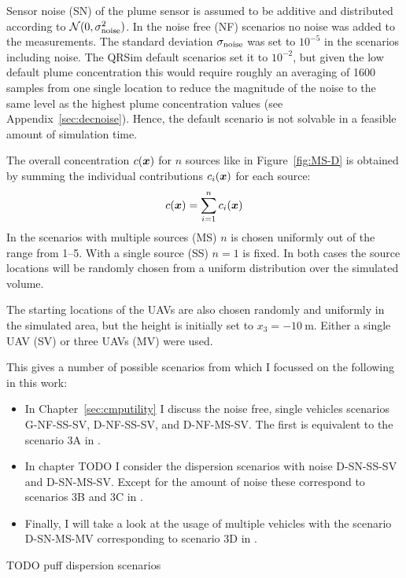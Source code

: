 Sensor noise (SN) of the plume sensor is assumed to be additive and distributed 
according to $\mathcal{N}(0, \sigma_{\mathrm{noise}}^2)$. In the noise free (NF) 
scenarios no noise was added to the measurements. The standard deviation 
$\sigma_{\mathrm{noise}}$ was set to $10^{-5}$ in the scenarios including noise. The 
QRSim default scenarios set it to $10^{-2}$, but given the low default plume 
concentration this would require roughly an averaging of 1600 samples from one 
single location to reduce the magnitude of the noise to the same level as the 
highest plume concentration values (see Appendix~\ref{sec:decnoise}). Hence, the 
default scenario is not solvable in a feasible amount of simulation time.

The overall concentration $c(\bm{x})$ for $n$ sources like in 
Figure~\ref{fig:MS-D} is obtained by summing the individual contributions 
$c_i(\bm{x})$ for each source:
\begin{equation}
    c(\bm{x}) = \sum_{i = 1}^n c_i(\bm{x})
\end{equation}
In the scenarios with multiple sources (MS) $n$ is chosen uniformly out of the 
range from \numrange{1}{5}. With a single source (SS) $n = 1$ is fixed. In both 
cases the source locations will be randomly chosen from a uniform distribution 
over the simulated volume.

The starting locations of the UAVs are also chosen randomly and uniformly in the 
simulated area, but the height is initially set to $x_3 = \SI{-10}{\meter}$.  
Either a single UAV (SV) or three UAVs (MV) were used.

This gives a number of possible scenarios from which I focussed on the following 
in this work:
\begin{itemize}
    \item In Chapter~\ref{sec:cmputility} I discuss the noise free, single 
        vehicles scenarios G-NF-SS-SV, D-NF-SS-SV, and D-NF-MS-SV\@. The first 
        is equivalent to the scenario 3A in \textcite{denardi2013rn}.
    \item In chapter TODO I consider the dispersion scenarios with noise 
        D-SN-SS-SV and D-SN-MS-SV\@. Except for the amount of noise these 
        correspond to scenarios 3B and 3C in \textcite{denardi2013rn}.
    \item Finally, I will take a look at the usage of multiple vehicles with the 
        scenario D-SN-MS-MV corresponding to scenario 3D in 
        \textcite{denardi2013rn}.
\end{itemize}

TODO puff dispersion scenarios

